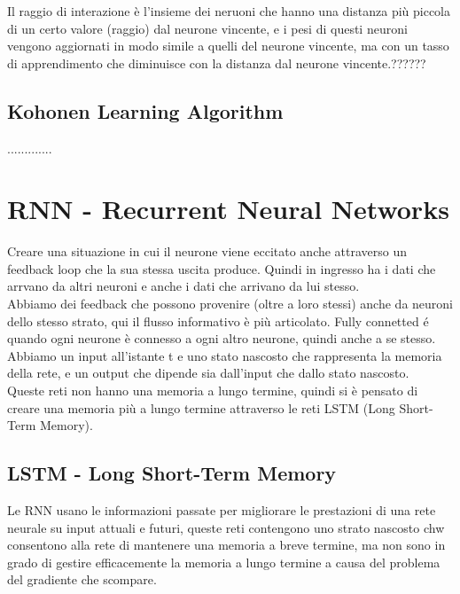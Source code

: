 Il raggio di interazione è l'insieme dei neruoni che hanno una distanza più piccola di un certo valore (raggio) dal neurone vincente, e i pesi di questi neuroni vengono aggiornati in modo simile a quelli del neurone vincente, ma con un tasso di apprendimento che diminuisce con la distanza dal neurone vincente.??????\\

\subsection{Kohonen Learning Algorithm}

.............


\section{RNN - Recurrent Neural Networks}

Creare una situazione in cui il neurone viene eccitato anche attraverso un feedback loop che la sua stessa uscita produce. Quindi in ingresso ha i dati che arrvano
da altri neuroni e anche i dati che arrivano da lui stesso.\\

Abbiamo dei feedback che possono provenire (oltre a loro stessi) anche da neuroni dello stesso strato, qui il flusso informativo è più articolato. 
Fully connetted é quando ogni neurone è connesso a ogni altro neurone, quindi anche a se stesso.\\

Abbiamo un input all'istante t e uno stato nascosto che rappresenta la memoria della rete, e un output che dipende sia dall'input che dallo stato nascosto.\\
Queste reti non hanno una memoria a lungo termine, quindi si è pensato di creare una memoria più a lungo termine attraverso le reti LSTM (Long Short-Term Memory).

\subsection{LSTM - Long Short-Term Memory}
Le RNN usano le informazioni passate per migliorare le prestazioni di una rete neurale su input attuali e futuri, queste reti contengono uno strato nascosto chw 
consentono alla rete di mantenere una memoria a breve termine, ma non sono in grado di gestire efficacemente la memoria a lungo termine a causa del problema del gradiente che scompare.\\

